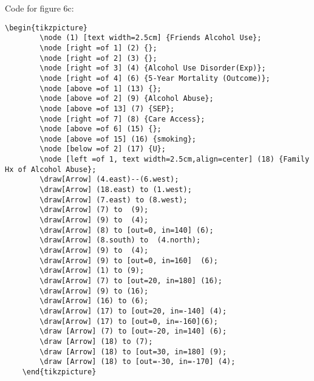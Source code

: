 \documentclass{article}
\begin{document}
\newpage
Code for figure 6c:
\begin{lstlisting}[frame=single, basicstyle=\ttfamily]
    \begin{tikzpicture}
        \node (1) [text width=2.5cm] {Friends Alcohol Use};
        \node [right =of 1] (2) {};
        \node [right =of 2] (3) {};
        \node [right =of 3] (4) {Alcohol Use Disorder(Exp)};
        \node [right =of 4] (6) {5-Year Mortality (Outcome)};
        \node [above =of 1] (13) {};
        \node [above =of 2] (9) {Alcohol Abuse};
        \node [above =of 13] (7) {SEP};
        \node [right =of 7] (8) {Care Access};
        \node [above =of 6] (15) {};
        \node [above =of 15] (16) {smoking};
        \node [below =of 2] (17) {U};
        \node [left =of 1, text width=2.5cm,align=center] (18) {Family Hx of Alcohol Abuse};
        \draw[Arrow] (4.east)--(6.west);
        \draw[Arrow] (18.east) to (1.west);
        \draw[Arrow] (7.east) to (8.west);
        \draw[Arrow] (7) to  (9);
        \draw[Arrow] (9) to  (4);
        \draw[Arrow] (8) to [out=0, in=140] (6);
        \draw[Arrow] (8.south) to  (4.north);
        \draw[Arrow] (9) to  (4);
        \draw[Arrow] (9) to [out=0, in=160]  (6);
        \draw[Arrow] (1) to (9);
        \draw[Arrow] (7) to [out=20, in=180] (16);
        \draw[Arrow] (9) to (16);
        \draw[Arrow] (16) to (6);
        \draw[Arrow] (17) to [out=20, in=-140] (4);
        \draw[Arrow] (17) to [out=0, in=-160](6);
        \draw [Arrow] (7) to [out=-20, in=140] (6);
        \draw [Arrow] (18) to (7);
        \draw [Arrow] (18) to [out=30, in=180] (9);
        \draw [Arrow] (18) to [out=-30, in=-170] (4);
    \end{tikzpicture}
\end{lstlisting}
\end{document}

